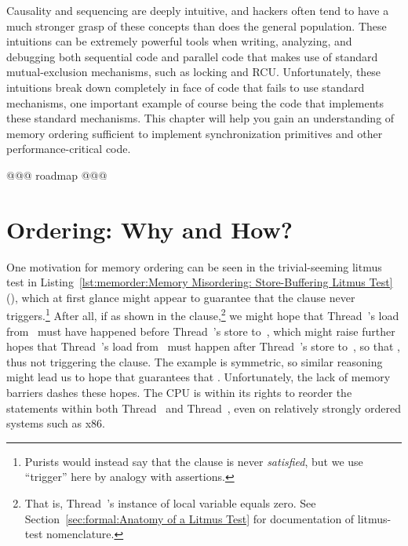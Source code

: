 
%

Causality and sequencing are deeply intuitive, and hackers often
tend to have a much stronger grasp of these concepts than does
the general population.
These intuitions can be extremely powerful tools when writing, analyzing,
and debugging both sequential code and parallel code that makes
use of standard mutual-exclusion mechanisms, such as locking and
RCU.
Unfortunately, these intuitions break down completely in face of
code that fails to use standard mechanisms, one important example
of course being the code that implements these standard mechanisms.
This chapter will help you gain an understanding of memory ordering
sufficient to implement synchronization primitives and other
performance-critical code.

@@@ roadmap @@@

\section{Ordering: Why and How?}
\label{sec:memorder:Ordering: Why and How?}

One motivation for memory ordering can be seen in the trivial-seeming
litmus test in
Listing~\ref{lst:memorder:Memory Misordering: Store-Buffering Litmus Test}
(),
which at first glance might
appear to guarantee that the  clause never triggers.\footnote{
	Purists would instead say that the  clause is
	never \emph{satisfied}, but we use ``trigger'' here by
	analogy with assertions.}
After all, if  as shown in the  clause,\footnote{
	That is, Thread~'s instance of local variable 
	equals zero.
	See Section~\ref{sec:formal:Anatomy of a Litmus Test}
	for documentation of litmus-test nomenclature.}
we might hope that Thread~'s
load from~ must have happened before Thread~'s store to~,
which might raise
further hopes that Thread~'s load from~ must happen after
Thread~'s store to~, so that ,
thus not triggering the  clause.
The example is symmetric, so similar reasoning might lead
us to hope that  guarantees that .
Unfortunately, the lack of memory barriers dashes these hopes.
The CPU is within its rights to reorder
the statements within both Thread~ and Thread~,
even on relatively strongly ordered systems such as x86.

